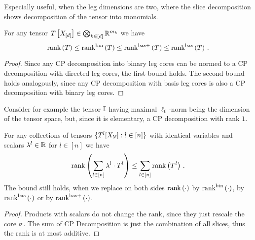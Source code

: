 
Especially useful, when the leg dimensions are two, where the slice decomposition shows decomposition of the tensor into monomials.


\begin{theorem}\label{the:sliceToCP}
	For any tensor $T\left[X_{[d]}\right]\in\bigotimes_{k\in[d]} \mathbb{R}^{m_{k}}$ we have
		\[ \mathrm{rank}\left(T\right) 
		\leq \mathrm{rank}^{\mathrm{bin}}\left(T\right) 
		\leq \mathrm{rank}^{\mathrm{bas+}}\left(T\right) 
		\leq \mathrm{rank}^{\mathrm{bas}}\left(T\right) \, . \]
\end{theorem}	
\begin{proof}
	Since any CP decomposition into binary leg cores can be normed to a CP decomposition with directed leg cores, the first bound holds.
	The second bound holds analogously, since any CP decomposition with basis leg cores is also a CP decomposition with binary leg cores.
\end{proof}


Consider for example the tensor $\mathbb{I}$ having maximal $\ell_0$-norm being the dimension of the tensor space, but, since it is elementary, a CP decomposition with rank $1$.



\begin{theorem}\label{the:CPrankSumBound}
	For any collections of tensors $\{T^{l}[X_{\mathcal{V}}] : l \in [n]\}$ with identical variables and scalars $\lambda^{l} \in \mathbb{R}$ for $l\in[n]$  we have
		\[ \mathrm{rank}\left(\sum_{l \in [n]} \lambda^{l} \cdot T^{l}\right) \leq \sum_{l\in[n]}  \mathrm{rank}\left(T^{l}\right)  \, . \]
	The bound still holds, when we replace on both sides $\mathrm{rank}\left(\cdot\right)$ by $\mathrm{rank}^{\mathrm{bin}}\left(\cdot\right)$, by $\mathrm{rank}^{\mathrm{bas}}\left(\cdot\right)$ or by $\mathrm{rank}^{\mathrm{bas+}}\left(\cdot\right)$.
\end{theorem}
\begin{proof}
	Products with scalars do not change the rank, since they just rescale the core $\sigma$.
	The sum of CP Decomposition is just the combination of all slices, thus the rank is at most additive.
\end{proof}


